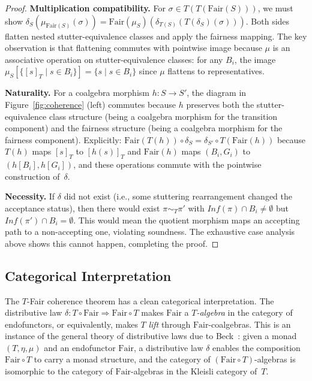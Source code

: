 \documentclass[11pt]{article}
\newcommand{\Fair}{\ensuremath{\mathrm{Fair}}}
\newcommand{\TFair}{$T$-Fair}
\begin{document}
\begin{proof}
\textbf{Multiplication compatibility.}
For $\sigma \in T(T(\Fair(S)))$, we must show
$\delta_S(\mu_{\Fair(S)}(\sigma))
= \Fair(\mu_S)(\delta_{T(S)}(T(\delta_S)(\sigma)))$.
Both sides flatten nested stutter-equivalence classes and apply the
fairness mapping.
The key observation is that flattening commutes with pointwise image
because $\mu$ is an associative operation on stutter-equivalence classes:
for any $B_i$, the image $\mu_S[\{[s]_T \mid s \in B_i\}]
= \{s \mid s \in B_i\}$ since $\mu$ flattens to representatives.

\textbf{Naturality.}
For a coalgebra morphism $h : S \to S'$, the diagram in
Figure~\ref{fig:coherence} (left) commutes because $h$ preserves both
the stutter-equivalence class structure (being a coalgebra morphism for
the transition component) and the fairness structure (being a coalgebra
morphism for the fairness component).
Explicitly:
$\Fair(T(h)) \circ \delta_S = \delta_{S'} \circ T(\Fair(h))$
because $T(h)$ maps $[s]_T$ to $[h(s)]_T$ and $\Fair(h)$ maps
$(B_i, G_i)$ to $(h[B_i], h[G_i])$, and these operations commute
with the pointwise construction of~$\delta$.

\textbf{Necessity.}
If $\delta$ did not exist (i.e., some stuttering rearrangement changed
the acceptance status), then there would exist $\pi \sim_T \pi'$ with
$\mathit{Inf}(\pi) \cap B_i \neq \emptyset$ but
$\mathit{Inf}(\pi') \cap B_i = \emptyset$.
This would mean the quotient morphism maps an accepting path to a
non-accepting one, violating soundness.
The exhaustive case analysis above shows this cannot happen, completing
the proof.
\end{proof}

\subsection{Categorical Interpretation}

The \TFair{} coherence theorem has a clean categorical interpretation.
The distributive law $\delta : T \circ \Fair \Rightarrow \Fair \circ T$
makes $\Fair$ a \emph{$T$-algebra} in the category of endofunctors,
or equivalently, makes $T$ \emph{lift} through $\Fair$-coalgebras.
This is an instance of the general theory of distributive laws due to
Beck~\cite{Beck69}: given a monad $(T, \eta, \mu)$ and an endofunctor
$\Fair$, a distributive law $\delta$ enables the composition
$\Fair \circ T$ to carry a monad structure, and the category of
$(\Fair \circ T)$-algebras is isomorphic to the category of $\Fair$-algebras
in the Kleisli category of~$T$.
\end{document}
